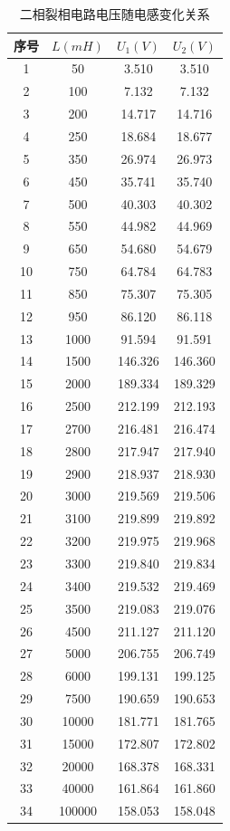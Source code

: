 \documentclass[12pt]{article}%
\begin{document}
\begin{table}[htbp]
  \centering
  \caption{\heiti{}二相裂相电路电压随电感变化关系}
    \begin{tabular}{cccc}
        \hline
   序号 & $L(mH)$  & $U_1(V)$ & $U_2(V)$ \\
        \hline
    1  & 50 & 3.510  & 3.510  \\
    2  & 100 & 7.132  & 7.132  \\
    3  & 200 & 14.717  & 14.716  \\
    4  & 250 & 18.684  & 18.677  \\
    5  & 350 & 26.974  & 26.973  \\
    6  & 450 & 35.741  & 35.740  \\
    7  & 500 & 40.303  & 40.302  \\
    8  & 550 & 44.982  & 44.969  \\
    9  & 650 & 54.680  & 54.679  \\
    10 & 750 & 64.784  & 64.783  \\
    11 & 850 & 75.307  & 75.305  \\
    12 & 950 & 86.120  & 86.118  \\
    13 & 1000 & 91.594  & 91.591  \\
    14 & 1500 & 146.326  & 146.360  \\
    15 & 2000 & 189.334  & 189.329  \\
    16 & 2500 & 212.199  & 212.193  \\
    17 & 2700 & 216.481  & 216.474  \\
    18 & 2800 & 217.947  & 217.940  \\
    19 & 2900 & 218.937  & 218.930  \\
    20 & 3000 & 219.569  & 219.506  \\
    21 & 3100 & 219.899  & 219.892  \\
    22 & 3200 & 219.975  & 219.968  \\
    23 & 3300 & 219.840  & 219.834  \\
    24 & 3400 & 219.532  & 219.469  \\
    25 & 3500 & 219.083  & 219.076  \\
    26 & 4500 & 211.127  & 211.120  \\
    27 & 5000 & 206.755  & 206.749  \\
    28 & 6000 & 199.131  & 199.125  \\
    29 & 7500 & 190.659  & 190.653  \\
    30 & 10000 & 181.771  & 181.765  \\
    31 & 15000 & 172.807  & 172.802  \\
    32 & 20000 & 168.378  & 168.331  \\
    33 & 40000 & 161.864  & 161.860  \\
    34 & 100000 & 158.053  & 158.048  \\
            \hline
    \end{tabular}%
  \label{tab:addlabel3}%
\end{table}%
\onecolumn
\end{document}
